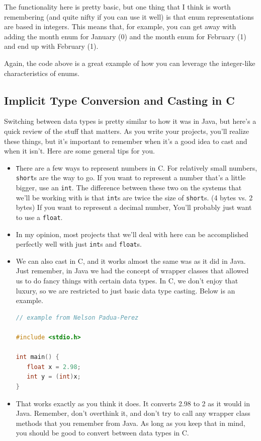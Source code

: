 \documentclass[english, 10pt]{article}
\begin{document}
The functionality here is pretty basic, but one thing that I think is worth remembering (and quite nifty if you can use it well) is that enum representations are based in integers. This means that, for example, you can get away with adding the month enum for January (0) and the month enum for February (1) and end up with February (1).\newline

Again, the code above is a great example of how you can leverage the integer-like characteristics of enums.

\subsection{Implicit Type Conversion and Casting in C}

Switching between data types is pretty similar to how it was in Java, but here's a quick review of the stuff that matters. As you write your projects, you'll realize these things, but it's important to remember when it's a good idea to cast and when it isn't. Here are some general tips for you.\newline

\begin{itemize}
	\item \texttt There are a few ways to represent numbers in C. For relatively small numbers, \texttt{short}s are the way to go. If you want to represent a number that's a little bigger, use an \texttt{int}. The difference between these two on the systems that we'll be working with is that \texttt{int}s are twice the size of \texttt{short}s. (4 bytes vs. 2 bytes) If you want to represent a decimal number, You'll probably just want to use a \texttt{float}.
	\item In my opinion, most projects that we'll deal with here can be accomplished perfectly well with just \texttt{int}s and \texttt{float}s.
		\item We can also cast in C, and it works almost the same was as it did in Java. Just remember, in Java we had the concept of wrapper classes that allowed us to do fancy things with certain data types. In C, we don't enjoy that luxury, so we are restricted to just basic data type casting. Below is an example.
	
	
	{\centering
\begin{lstlisting}[language=C]
// example from Nelson Padua-Perez

#include <stdio.h>                                                                    
                                                                                      
int main() {                                                                          
   float x = 2.98;
   int y = (int)x;
}
\end{lstlisting}
}

\item That works exactly as you think it does. It converts 2.98 to 2 as it would in Java. Remember, don't overthink it, and don't try to call any wrapper class methods that you remember from Java. As long as you keep that in mind, you should be good to convert between data types in C.
\end{itemize}
\end{document}
